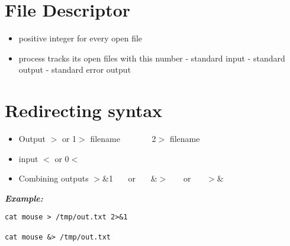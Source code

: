 \documentclass{report}
\begin{document}
\section{File Descriptor}

\begin{itemize}
  \item positive integer for every open file
  \item process tracks its open files with this number
    \bigbreak \noindent
     - standard input
     - standard output
     - standard error output
\end{itemize}
\section{Redirecting syntax}
\begin{itemize}
  \item Output
    \subitem $>$ or 1$>$ filename
\subitem  \ \ \ \ \ \ \ 2$>$ filename
\item input
  \subitem $<$ or 0$<$
\item Combining outputs
  $>$\&1 \ \ \ or \ \ \ \&$>$ \ \ \ or \ \ \ $>$\&
\end{itemize}
\textit{\textbf{Example:}}
\begin{verbatim}
cat mouse > /tmp/out.txt 2>&1

cat mouse &> /tmp/out.txt

\end{verbatim}
\end{document}
